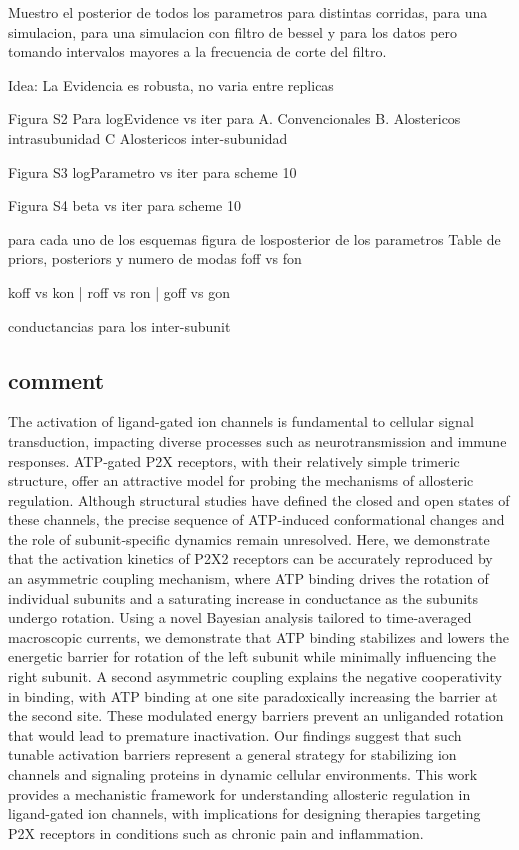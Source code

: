 \documentclass[a4paper,12pt]{article}
\begin{document}
		Muestro el posterior de todos los parametros para distintas corridas, para una simulacion, para una simulacion con filtro de bessel y para los datos pero tomando intervalos mayores a la frecuencia de corte del filtro. 
		
		Idea: La Evidencia es robusta, no varia entre replicas 
		
		
		Figura S2
		Para logEvidence vs iter para
		A. Convencionales
		B. Alostericos intrasubunidad
		C Alostericos inter-subunidad
		
		Figura S3 
		logParametro vs iter para scheme 10
		
		
		Figura S4
		beta vs iter para scheme 10
		
		
		
		para cada uno de los esquemas
		figura de losposterior de los parametros
		Table de priors, posteriors y numero de modas
		foff vs fon
		
		koff vs kon | roff vs ron | goff vs gon
		
		conductancias para los inter-subunit
		
	
	\subsection{comment}
		
	 
		The activation of ligand-gated ion channels is fundamental to cellular signal transduction, impacting diverse processes such as neurotransmission and immune responses. ATP‐gated P2X receptors, with their relatively simple trimeric structure, offer an attractive model for probing the mechanisms of allosteric regulation. Although structural studies have defined the closed and open states of these channels, the precise sequence of ATP‐induced conformational changes and the role of subunit‐specific dynamics remain unresolved. Here, we demonstrate that the activation kinetics of P2X2 receptors can be accurately reproduced by an asymmetric coupling mechanism, where ATP binding drives the rotation of individual subunits and a saturating increase in conductance as the subunits undergo rotation. Using a novel Bayesian analysis tailored to time-averaged macroscopic currents, we demonstrate that ATP binding stabilizes and lowers the energetic barrier for rotation of the left subunit while minimally influencing the right subunit. A second asymmetric coupling explains the negative cooperativity in binding, with ATP binding at one site paradoxically increasing the barrier at the second site. These modulated energy barriers prevent an unliganded rotation that would lead to premature inactivation. Our findings suggest that such tunable activation barriers represent a general strategy for stabilizing ion channels and signaling proteins in dynamic cellular environments. This work provides a mechanistic framework for understanding allosteric regulation in ligand-gated ion channels, with implications for designing therapies targeting P2X receptors in conditions such as chronic pain and inflammation.
		
\end{document}

